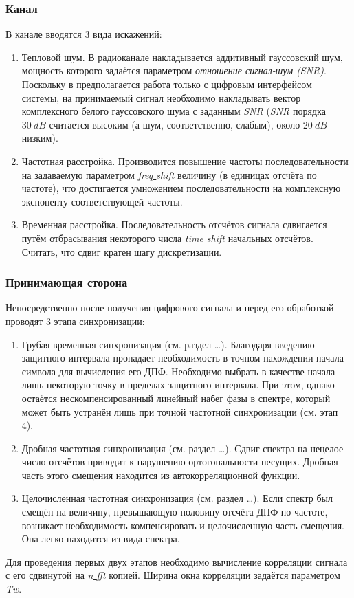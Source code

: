 \subsubsection{Канал}
В канале вводятся 3 вида искажений:
\begin{enumerate}
\item 
Тепловой шум. В радиоканале накладывается аддитивный гауссовский шум, мощность которого задаётся параметром \textit{отношение сигнал-шум (SNR)}. Поскольку в предполагается работа только с цифровым интерфейсом системы, на принимаемый сигнал необходимо накладывать вектор комплексного белого гауссовского шума с заданным \textit{SNR} (\textit{SNR} порядка $30\ dB$ считается высоким (а шум, соответственно, слабым), около $20\ dB$ -- низким).
\item		%
Частотная расстройка. Производится повышение частоты последовательности на задаваемую параметром \textit{freq\underline{ }shift} величину (в единицах отсчёта по частоте), что достигается умножением последовательности на комплексную экспоненту соответствующей частоты.
\item
Временная расстройка. Последовательность отсчётов сигнала сдвигается путём отбрасывания некоторого числа \textit{time\underline{ }shift} начальных отсчётов. Считать, что сдвиг кратен шагу дискретизации.
\end{enumerate}

\subsubsection{Принимающая сторона}
Непосредственно после получения цифрового сигнала и перед его обработкой проводят 3 этапа синхронизации:
\begin{enumerate}
\item
Грубая временная синхронизация (см. раздел …). Благодаря введению защитного интервала пропадает необходимость в точном нахождении начала символа для вычисления его ДПФ. Необходимо выбрать в качестве начала лишь некоторую точку в пределах защитного интервала. При этом, однако остаётся нескомпенсированный линейный набег фазы в спектре, который может быть устранён лишь при точной частотной синхронизации (см. этап 4).
\item
Дробная частотная синхронизация (см. раздел …). Сдвиг спектра на нецелое число отсчётов приводит к нарушению ортогональности несущих. Дробная часть этого смещения находится из автокорреляционной функции.
\item
Целочисленная частотная синхронизация (см. раздел …). Если спектр был смещён на величину, превышающую половину отсчёта ДПФ по частоте, возникает необходимость компенсировать и целочисленную часть смещения. Она легко находится из вида спектра.
\end{enumerate}
Для проведения первых двух этапов необходимо вычисление корреляции сигнала с его сдвинутой на \textit{n\underline{ }fft} копией. Ширина окна корреляции задаётся параметром \textit{Tw}.

